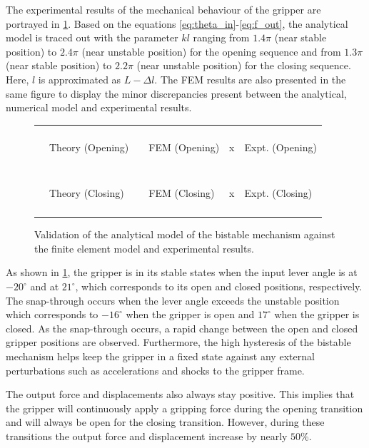 The experimental results of the mechanical behaviour of the gripper are portrayed in \cref{fig:bistable graph}. Based on the equations \ref{eq:theta_in}-\ref{eq:f_out}, the analytical model is traced out with the parameter $kl$ ranging from $1.4\pi$ (near stable position) to $2.4\pi$ (near unstable position) for the opening sequence and from $1.3\pi$ (near stable position) to $2.2\pi$ (near unstable position) for the closing sequence. Here, $l$ is approximated as $L-\Delta l$. The FEM results are also presented in the same figure to display the minor discrepancies present between the analytical, numerical model and experimental results.
\begin{figure}[htp!] %
    \centering
    \resizebox{0.7\textwidth}{!}{}
    \begin{tabular}{l@{ }l l@{ }l l@{ }l}
        {\color{myblue} \rule[2pt]{10pt}{0.5mm} } & {\footnotesize Theory (Opening)} & {\color{myblue} \rule[2pt]{1pt}{0.5mm} \rule[2pt]{1pt}{0.5mm} \rule[2pt]{1pt}{0.5mm} } & {\footnotesize FEM (Opening)} & {\color{myblue} x } & {\footnotesize Expt. (Opening)}\\
        {\color{myred} \rule[2pt]{10pt}{0.5mm} } & {\footnotesize Theory (Closing)} & {\color{myred} \rule[2pt]{1pt}{0.5mm} \rule[2pt]{1pt}{0.5mm} \rule[2pt]{1pt}{0.5mm} } & {\footnotesize FEM (Closing)} & {\color{myred} x } & {\footnotesize Expt. (Closing)}\\
    \end{tabular}
    \caption{Validation of the analytical model of the bistable mechanism against the finite element model and experimental results.}
    \label{fig:bistable graph}
\end{figure}

As shown in \cref{fig:bistable graph}, the gripper is in its stable states when the input lever angle is at $-20^{\circ}$ and at $21^{\circ}$, which corresponds to its open and closed positions, respectively. The snap-through occurs when the lever angle exceeds the unstable position which corresponds to $-16^{\circ}$ when the gripper is open and $17^{\circ}$ when the gripper is closed. As the snap-through occurs, a rapid change between the open and closed gripper positions are observed. Furthermore, the high hysteresis of the bistable mechanism helps keep the gripper in a fixed state against any external perturbations such as accelerations and shocks to the gripper frame.

The output force and displacements also always stay positive. This implies that the gripper will continuously apply a gripping force during the opening transition and will always be open for the closing transition. However, during these transitions the output force and displacement increase by nearly $50$\%.

